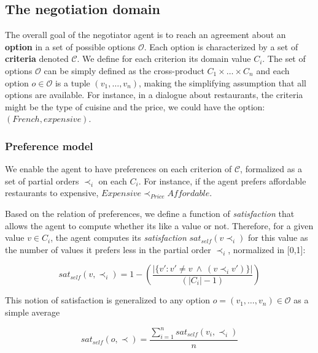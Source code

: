 \documentclass[runningheads,a4paper]{llncs}
\begin{document}
	\subsection{The negotiation domain}
	
	The overall goal of the negotiator agent is to reach an agreement about an \textbf{option} in a set of possible options $\mathcal{O}$. 
	Each option is characterized by a set of \textbf{criteria} denoted $\mathcal{C}$. We define for each criterion its domain value $C_i$.
	The set of options $\mathcal{O}$ can be simply defined as the cross-product $C_1\times\ldots\times C_n$ and each option $o\in\mathcal{O}$ is a tuple $(v_1,\ldots,v_n)$, making the simplifying assumption that all options are available. For instance, in a dialogue about restaurants, the criteria might be the type of cuisine and the price, we could have the option: $(French,expensive)$.
	
	\subsubsection{Preference model} 
	We enable the agent to have preferences on each criterion of $\mathcal{C}$, formalized as a set of partial orders $\prec_i$ on each $C_i$. For instance, if the agent prefers affordable restaurants to expensive, $Expensive\prec_{Price}Affordable$.
	
	Based on the relation of preferences, we define a function of \emph{satisfaction} that allows the agent to compute whether its like a value or not. Therefore, for a given value $v\in C_i$, the agent computes its \emph{satisfaction} $sat_{self}(v \prec_i)$ for this value as the number of values it prefers less in the partial order $\prec_i$, normalized in [0,1]:
	
	\begin{equation}
	sat_{self}(v, \prec_i) =	1 - \left( \frac{|\{v' : v' \neq v \  \wedge \ (v \prec_i v')\}| }{( |C_i| - 1 )}\right)
	\end{equation}
	
	This notion of satisfaction is generalized to any option $o= (v_1, \ldots, v_n)\in \mathcal{O}$ as a simple average
	
	\begin{equation}
	sat_{self}(o, \prec) = \frac{\sum_{i=1}^{n} sat_{self}(v_i, \prec_i) }{n}
	\end{equation}
	
	
\end{document}
